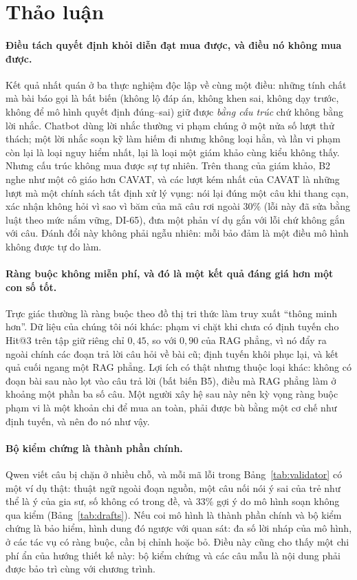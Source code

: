 \section{Thảo luận}\label{sec:discussion}

\paragraph{Điều tách quyết định khỏi diễn đạt mua được, và điều nó không mua được.}
Kết quả nhất quán ở ba thực nghiệm độc lập về cùng một điều: những tính chất mà bài báo gọi là bất biến (không lộ đáp án, không khen sai, không dạy trước, không để mô hình quyết định đúng--sai) giữ được \emph{bằng cấu trúc} chứ không bằng lời nhắc. Chatbot dùng lời nhắc thường vi phạm chúng ở một nửa số lượt thử thách; một lời nhắc soạn kỹ làm hiếm đi nhưng không loại hẳn, và lần vi phạm còn lại là loại nguy hiểm nhất, lại là loại một giám khảo cùng kiểu không thấy. Nhưng cấu trúc không mua được sự tự nhiên. Trên thang của giám khảo, B2 nghe như một cô giáo hơn CAVAT, và các lượt kém nhất của CAVAT là những lượt mà một chính sách tất định xử lý vụng: nói lại đúng một câu khi thang cạn, xác nhận không hỏi vì sao vì băm của mã câu rơi ngoài $30\%$ (lỗi này đã sửa bằng luật theo mức nắm vững, DI-65), đưa một phản ví dụ gắn với lỗi chứ không gắn với câu. Đánh đổi này không phải ngẫu nhiên: mỗi bảo đảm là một điều mô hình không được tự do làm.

\paragraph{Ràng buộc không miễn phí, và đó là một kết quả đáng giá hơn một con số tốt.}
Trực giác thường là ràng buộc theo đồ thị tri thức làm truy xuất ``thông minh hơn''. Dữ liệu của chúng tôi nói khác: phạm vi chặt khi chưa có định tuyến cho Hit@3 trên tập giữ riêng chỉ $0{,}45$, so với $0{,}90$ của RAG phẳng, vì nó đẩy ra ngoài chính các đoạn trả lời câu hỏi về bài cũ; định tuyến khôi phục lại, và kết quả cuối ngang một RAG phẳng. Lợi ích có thật nhưng thuộc loại khác: không có đoạn bài sau nào lọt vào câu trả lời (bất biến B5), điều mà RAG phẳng làm ở khoảng một phần ba số câu. Một người xây hệ sau này nên kỳ vọng ràng buộc phạm vi là một khoản chi để mua an toàn, phải được bù bằng một cơ chế như định tuyến, và nên đo nó như vậy.

\paragraph{Bộ kiểm chứng là thành phần chính.}
Qwen viết câu bị chặn ở nhiều chỗ, và mỗi mã lỗi trong Bảng~\ref{tab:validator} có một ví dụ thật: thuật ngữ ngoài đoạn nguồn, một câu nối nói ý sai của trẻ như thể là ý của gia sư, số không có trong đề, và $33\%$ gợi ý do mô hình soạn không qua kiểm (Bảng~\ref{tab:drafts}). Nếu coi mô hình là thành phần chính và bộ kiểm chứng là bảo hiểm, hình dung đó ngược với quan sát: đa số lời nháp của mô hình, ở các tác vụ có ràng buộc, cần bị chỉnh hoặc bỏ. Điều này cũng cho thấy một chi phí ẩn của hướng thiết kế này: bộ kiểm chứng và các câu mẫu là nội dung phải được bảo trì cùng với chương trình.

